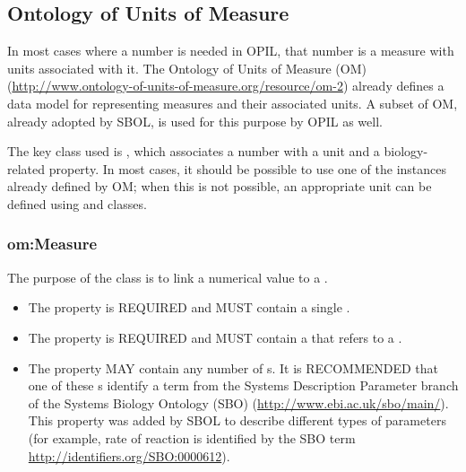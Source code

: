 \subsection{Ontology of Units of Measure}

In most cases where a number is needed in OPIL, that number is a measure with units associated with it.
The Ontology of Units of Measure (OM) (\url{http://www.ontology-of-units-of-measure.org/resource/om-2}) already defines a data model for representing measures and their associated units. 
A subset of OM, already adopted by SBOL, is used for this purpose by OPIL as well.

The key class used is , which associates a number with a unit and a biology-related property.
In most cases, it should be possible to use one of the  instances already defined by OM; when this is not possible, an appropriate unit can be defined using  and  classes.

\subsubsection{om:Measure} \label{sec:om:Measure}

The purpose of the  class is to link a numerical value to a . 

\begin{itemize}
\item \label{sec:om:hasNumericalValue}
The  property is REQUIRED and MUST contain a single .

\item \label{sec:om:hasUnit:Measure}
The  property is REQUIRED and MUST contain a  that refers to a . 

\item \label{sec:sbol:type:Measure}
The  property MAY contain any number of s. It is RECOMMENDED that one of these s identify a term from the Systems Description Parameter branch of the Systems Biology Ontology (SBO) (\url{http://www.ebi.ac.uk/sbo/main/}). This  property was added by SBOL to describe different types of parameters 
(for example, rate of reaction is identified by the SBO term \url{http://identifiers.org/SBO:0000612}).


\end{itemize}



